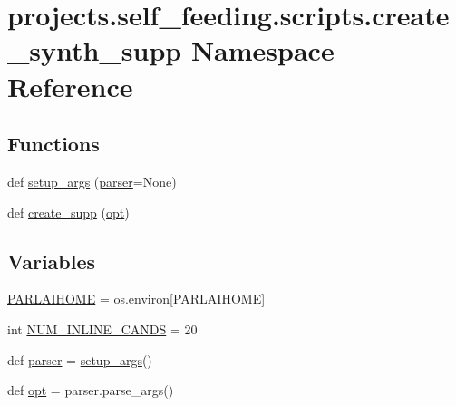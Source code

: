 \hypertarget{namespaceprojects_1_1self__feeding_1_1scripts_1_1create__synth__supp}{}\section{projects.\+self\+\_\+feeding.\+scripts.\+create\+\_\+synth\+\_\+supp Namespace Reference}
\label{namespaceprojects_1_1self__feeding_1_1scripts_1_1create__synth__supp}
\subsection*{Functions}
\begin{DoxyCompactItemize}
\item 
def \hyperlink{namespaceprojects_1_1self__feeding_1_1scripts_1_1create__synth__supp_ac102836989a094f474dc72bb0aea814e}{setup\+\_\+args} (\hyperlink{namespaceprojects_1_1self__feeding_1_1scripts_1_1create__synth__supp_a67949766fd429c2c63a5baa8352de0ba}{parser}=None)
\item 
def \hyperlink{namespaceprojects_1_1self__feeding_1_1scripts_1_1create__synth__supp_a81cbb13896d9614507b68362e90d8f6c}{create\+\_\+supp} (\hyperlink{namespaceprojects_1_1self__feeding_1_1scripts_1_1create__synth__supp_a656409f0a8ce971e8046f6576470b4c5}{opt})
\end{DoxyCompactItemize}
\subsection*{Variables}
\begin{DoxyCompactItemize}
\item 
\hyperlink{namespaceprojects_1_1self__feeding_1_1scripts_1_1create__synth__supp_a908a2aa407818b82de25657d8134fad0}{P\+A\+R\+L\+A\+I\+H\+O\+ME} = os.\+environ\mbox{[}\textquotesingle{}P\+A\+R\+L\+A\+I\+H\+O\+ME\textquotesingle{}\mbox{]}
\item 
int \hyperlink{namespaceprojects_1_1self__feeding_1_1scripts_1_1create__synth__supp_a42fb4ae95bebe7fa6609bd81a897a609}{N\+U\+M\+\_\+\+I\+N\+L\+I\+N\+E\+\_\+\+C\+A\+N\+DS} = 20
\item 
def \hyperlink{namespaceprojects_1_1self__feeding_1_1scripts_1_1create__synth__supp_a67949766fd429c2c63a5baa8352de0ba}{parser} = \hyperlink{namespaceprojects_1_1self__feeding_1_1scripts_1_1create__synth__supp_ac102836989a094f474dc72bb0aea814e}{setup\+\_\+args}()
\item 
def \hyperlink{namespaceprojects_1_1self__feeding_1_1scripts_1_1create__synth__supp_a656409f0a8ce971e8046f6576470b4c5}{opt} = parser.\+parse\+\_\+args()
\end{DoxyCompactItemize}



